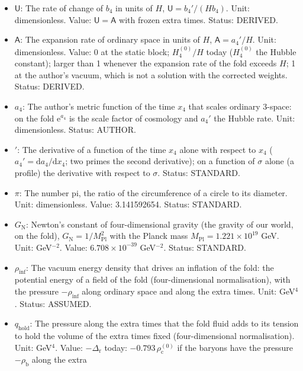 \documentclass[
  10pt,
]{article}
\providecommand{\tightlist}{%
  \setlength{\itemsep}{0pt}\setlength{\parskip}{0pt}}
\begin{document}
\begin{itemize}
\tightlist
\item
  \(\mathsf{U}\): The rate of change of \(b_4\) in units of \(H\),
  \(\mathsf{U} = b_4'/(Hb_4)\). Unit: dimensionless. Value:
  \(\mathsf{U} = \mathsf{A}\) with frozen extra times. Status: DERIVED.
\item
  \(\mathsf{A}\): The expansion rate of ordinary space in units of
  \(H\), \(\mathsf{A} = a_4'/H\). Unit: dimensionless. Value: 0 at the
  static block; \(H_4^{(0)}/H\) today (\(H_4^{(0)}\) the Hubble
  constant); larger than 1 whenever the expansion rate of the fold
  exceeds \(H\); 1 at the author's vacuum, which is not a solution with
  the corrected weights. Status: DERIVED.
\item
  \(a_4\): The author's metric function of the time \(x_4\) that scales
  ordinary 3-space: on the fold \(\mathrm{e}^{a_4}\) is the scale factor
  of cosmology and \(a_4'\) the Hubble rate. Unit: dimensionless.
  Status: AUTHOR.
\item
  \({}'\): The derivative of a function of the time \(x_4\) alone with
  respect to \(x_4\) (\(a_4' = \mathrm{d}a_4/\mathrm{d}x_4\); two primes
  the second derivative); on a function of \(\sigma\) alone (a profile)
  the derivative with respect to \(\sigma\). Status: STANDARD.
\item
  \(\pi\): The number pi, the ratio of the circumference of a circle to
  its diameter. Unit: dimensionless. Value: 3.141592654. Status:
  STANDARD.
\item
  \(G_{\mathrm{N}}\): Newton's constant of four-dimensional gravity (the
  gravity of our world, on the fold),
  \(G_{\mathrm{N}} = 1/M_{\mathrm{Pl}}^2\) with the Planck mass
  \(M_{\mathrm{Pl}} = 1.221\times10^{19}\) GeV. Unit: GeV\(^{-2}\).
  Value: \(6.708\times10^{-39}\) GeV\(^{-2}\). Status: STANDARD.
\item
  \(\rho_{\mathrm{inf}}\): The vacuum energy density that drives an
  inflation of the fold: the potential energy of a field of the fold
  (four-dimensional normalisation), with the pressure
  \(-\rho_{\mathrm{inf}}\) along ordinary space and along the extra
  times. Unit: GeV\(^4\). Status: ASSUMED.
\item
  \(q_{\mathrm{hold}}\): The pressure along the extra times that the
  fold fluid adds to its tension to hold the volume of the extra times
  fixed (four-dimensional normalisation). Unit: GeV\(^4\). Value:
  \(-\Delta_{\mathrm{r}}\) today: \(-0.793\,\rho_{\mathrm{c}}^{(0)}\) if
  the baryons have the pressure \(-\rho_{\mathrm{b}}\) along the extra

\end{itemize}
\end{document}
